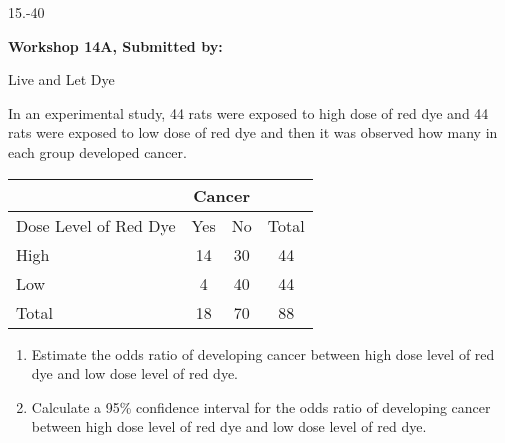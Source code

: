 \begin{exsol@exercise}{15.-40}
    \begin{center}
\begin{flushleft}\textbf{\large \hfill Workshop 14A, Submitted by: }\end{flushleft}

\end{center}

Live and Let Dye

In an experimental study, 44 rats were exposed to high dose of red dye and 44 rats were exposed to low dose of red dye and then it was observed how many in each group developed cancer.
			
\begin{tabular}{@{} lccc @{}} \hline				
 	& \multicolumn{2}{c}{Cancer} \\ \hline				
Dose Level of Red Dye &	Yes &	No &	Total \\ \hline
High &	14 &	30 &	44 \\
Low	& 4	& 40 &	44 \\ \hline
Total &	18 &	70 &	88 \\ \hline
\end{tabular}
				
\begin{enumerate}
  \item Estimate the odds ratio of developing cancer between high dose level of red dye and low dose level of red dye.
  \item Calculate a 95\% confidence interval for the odds ratio of developing cancer between high dose level of red dye and low dose level of red dye.
\end{enumerate}

\end{exsol@exercise}
